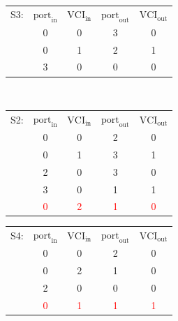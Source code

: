 \documentclass[10pt, a4paper]{article}
\begin{document}
\begin{enumerate}
\begin{enumerate}
\begin{enumerate}
\begin{tabular}{|c|c|c|c|c|}
                \hline
            \end{tabular}\qquad
            \begin{tabular}{|c|c|c|c|c|}
                \hline
                S3: & $\mbox{port}_{\mbox{in}}$ & $\mbox{VCI}_{\mbox{in}}$ & $\mbox{port}_{\mbox{out}}$ & $\mbox{VCI}_{\mbox{out}}$\\
                \cline {2-5}
                & 0 & 0 & 3 & 0\\
                \cline {2-5}
                & 0 & 1 & 2 & 1\\
                \cline {2-5}
                & 3 & 0 & 0 & 0\\
                \hline
            \end{tabular}\\

            \begin{tabular}{|c|c|c|c|c|}
                \hline
                S2: & $\mbox{port}_{\mbox{in}}$ & $\mbox{VCI}_{\mbox{in}}$ & $\mbox{port}_{\mbox{out}}$ & $\mbox{VCI}_{\mbox{out}}$\\
                \cline {2-5}
                & 0 & 0 & 2 & 0\\
                \cline {2-5}
                & 0 & 1 & 3 & 1\\
                \cline {2-5}
                & 2 & 0 & 3 & 0\\
                \cline {2-5}
                & 3 & 0 & 1 & 1\\
                \cline {2-5}
                & \textcolor{red}{0} & \textcolor{red}{2} & \textcolor{red}{1} & \textcolor{red}{0}\\
                \hline
            \end{tabular}\qquad
            \begin{tabular}{|c|c|c|c|c|}
                \hline
                S4: & $\mbox{port}_{\mbox{in}}$ & $\mbox{VCI}_{\mbox{in}}$ & $\mbox{port}_{\mbox{out}}$ & $\mbox{VCI}_{\mbox{out}}$\\
                \cline {2-5}
                & 0 & 0 & 2 & 0\\
                \cline {2-5}
                & 0 & 2 & 1 & 0\\
                \cline {2-5}
                & 2 & 0 & 0 & 0\\
                \cline {2-5}
                & \textcolor{red}{0} & \textcolor{red}{1} & \textcolor{red}{1} & \textcolor{red}{1}\\
                \hline
            \end{tabular}\\

\end{enumerate}
\end{enumerate}
\end{enumerate}
\end{document}
